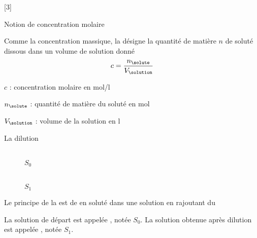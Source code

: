 [3]


\begin{doc}{Notion de concentration molaire}
  \begin{importants}
    Comme la concentration massique, la  désigne la quantité de matière $n$ de soluté dissous dans un volume de solution donné
    \begin{equation*}
      c = \dfrac{n_\solute}{V_\solution}
    \end{equation*}
  \end{importants}
  \begin{listePoints}
    \item $c$ : concentration molaire en \unit{\mole/\litre}
    \item $n_\solute$ : quantité de matière du soluté en \unit{\mole}
    \item $V_\solution$ : volume de la solution en \unit{\litre}
  \end{listePoints}
\end{doc}


\newpage\vspace*{-36pt}
\begin{doc}{La dilution}
  \begin{wrapfigure}[5]{r}{0.5\linewidth}
    \vspace*{-30pt}
    \centering
    \begin{multicols}{4}
     \\[-0pt]
    \footnotesize{$S_0$}
    
    
    
     \\[-0pt]
    \footnotesize{$S_1$}
    \end{multicols}
  \end{wrapfigure}
  \vAligne{-40pt}
  
  \begin{importants}
    Le principe de la  est de  en soluté dans une solution en rajoutant du 
  \end{importants}
  La solution de départ est appelée , notée $S_0$.
  La solution obtenue après dilution est appelée , notée $S_1$.
\end{doc}

